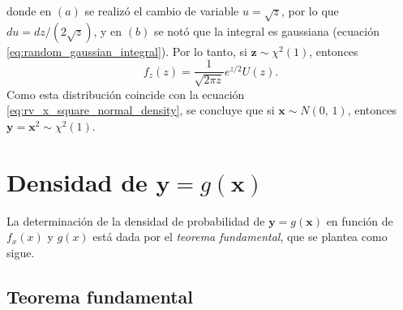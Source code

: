 \documentclass[a4paper]{report}
\newcommand{\x}{\mathbf{x}}
\newcommand{\y}{\mathbf{y}}
\newcommand{\z}{\mathbf{z}}
\begin{document}
donde en \((a)\) se realizó el cambio de variable \(u=\sqrt{z}\), por lo que \(du=dz/(2\sqrt{z})\), y en \((b)\) se notó que la integral es gaussiana (ecuación \ref{eq:random_gaussian_integral}). Por lo tanto, si \(\z\sim\chi^2(1)\), entonces
\[
 f_z(z)=\frac{1}{\sqrt{2\pi z}} e^{z/2}U(z).
\]
Como esta distribución coincide con la ecuación \ref{eq:rv_x_square_normal_density}, se concluye que si \(\x\sim N(0,\,1)\), entonces \(\y=\x^2\sim\chi^2(1)\).

\section{\texorpdfstring{Densidad de \(\y=g(\x)\)}{}}

La determinación de la densidad de probabilidad de \(\y=g(\x)\) en función de \(f_x(x)\) y \(g(x)\) está dada por el \emph{teorema fundamental}, que se plantea como sigue.

\subsection{Teorema fundamental}\label{sec:fundamental_theorem}
\end{document}
